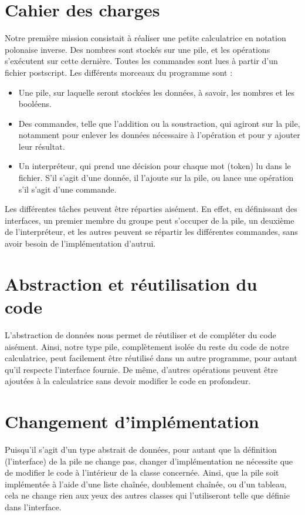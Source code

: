 \documentclass[11pt,a4paper]{article}
\begin{document}
\section{Cahier des charges}
Notre première mission consistait à réaliser une petite calculatrice en notation polonaise inverse. Des nombres sont stockés sur une pile, et les opérations s'exécutent sur cette dernière. Toutes les commandes sont lues à partir d'un fichier postscript. Les différents morceaux du programme sont :
\begin{itemize}
\item Une pile, sur laquelle seront stockées les données, à savoir, les nombres et les booléens.
\item Des commandes, telle que l'addition ou la soustraction, qui agiront sur la pile, notamment pour enlever les données nécessaire à l'opération et pour y ajouter leur résultat.
\item Un interpréteur, qui prend une décision pour chaque mot (token) lu dans le fichier. S'il s'agit d'une donnée, il l'ajoute sur la pile, ou lance une opération s'il s'agit d'une commande.
\end{itemize}
Les différentes tâches peuvent être réparties aisément. En effet, en définissant des interfaces, un premier membre du groupe peut s'occuper de la pile, un deuxième de l'interpréteur, et les autres peuvent se répartir les différentes commandes, sans avoir besoin de l'implémentation d'autrui.

\section{Abstraction et réutilisation du code}
L'abstraction de données nous permet de réutiliser et de compléter du code aisément. Ainsi, notre type pile, complètement isolée du reste du code de notre calculatrice, peut facilement être réutilisé dans un autre programme, pour autant qu'il respecte l'interface fournie. De même, d'autres opérations peuvent être ajoutées à la calculatrice sans devoir modifier le code en profondeur.

\section{Changement d'implémentation}
Puisqu'il s'agit d'un type abstrait de données, pour autant que la définition (l'interface) de la pile ne change pas, changer d'implémentation ne nécessite que de modifier le code à l'intérieur de la classe concernée. Ainsi, que la pile soit implémentée à l'aide d'une liste chaînée, doublement chaînée, ou d'un tableau, cela ne change rien aux yeux des autres classes qui l'utiliseront telle que définie dans l'interface.
\end{document}
